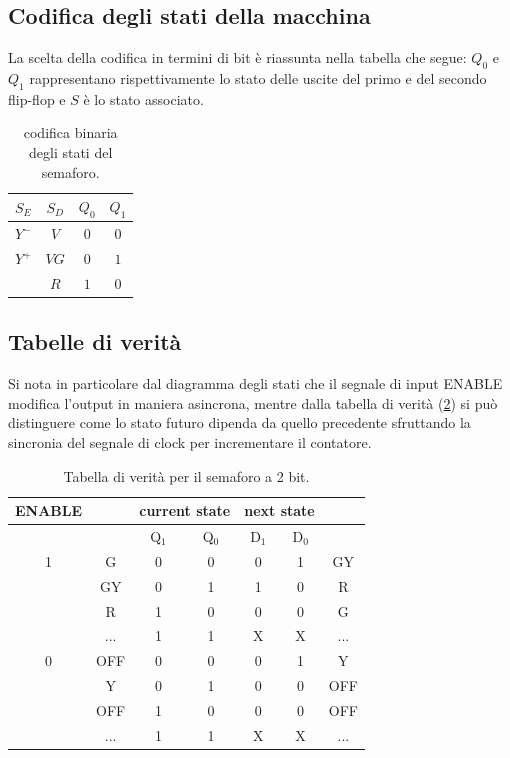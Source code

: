 \documentclass[10pt, a4paper, italian]{article}
\begin{document}
\subsection{Codifica degli stati della macchina}
La scelta della codifica in termini di bit \`e riassunta nella tabella che segue: $Q_0$ e $Q_1$ rappresentano rispettivamente lo stato delle uscite del primo e del secondo flip-flop e $S$ \`e lo stato associato.
\begin{table}[htbp]
	\centering
	\begin{tabular}{cc|cc}
	\toprule
	$S_E$ &	$S_D$ & $Q_0$ &	$Q_1$ \\
	\midrule
	\midrule
	$Y^-$ & $V$  & $0$	&	$0$	\\
	$Y^+$ & $VG$ & $0$	&	$1$	\\
	 	  & $R$  & $1$	&	$0$	\\
	\bottomrule
	\end{tabular}
	\caption{codifica binaria degli stati del semaforo. \label{tab:bit}}
\end{table}

\subsection{Tabelle di verità}
Si nota in particolare dal diagramma degli stati che il segnale di input ENABLE modifica l'output in maniera asincrona, mentre dalla tabella di verità (\cref{tab:2bit}) si può distinguere come lo stato futuro dipenda da quello precedente sfruttando la sincronia del segnale di clock per incrementare il contatore.

\begin{table}[htbp]
    \centering
    \begin{tabular}{c|c|cc|cc|c}
     \multicolumn{1}{c||}{ENABLE}&\multicolumn{1}{c}{ }&\multicolumn{2}{c||}{current state} &\multicolumn{2}{c}{next state}\\
     \hline
         && Q$_1$ & Q$_0$ & D$_1$ & D$_0$ & \\
         \hline
        1 & G & 0 & 0 & 0 & 1 & GY\\
       & GY & 0 & 1 & 1 & 0 & R\\
       & R & 1 & 0 & 0 & 0 & G\\
        & ... & 1 & 1 & X & X & ...\\
        \hline
        0 & OFF & 0 & 0 & 0 & 1 & Y \\
        & Y & 0 & 1 & 0 & 0 & OFF \\
         & OFF & 1 & 0 & 0 & 0& OFF \\
         &  ... & 1 & 1 & X & X & ...\\
    \end{tabular}
    \caption{Tabella di verità per il semaforo a 2 bit.}
    \label{tab:2bit}
\end{table}
\end{document}

